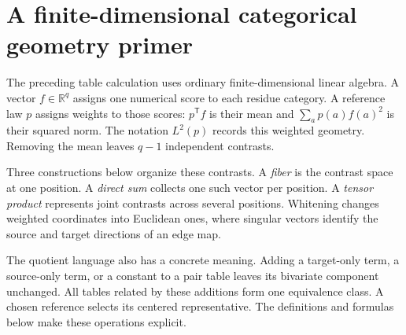 \section{A finite-dimensional categorical geometry primer}
\label{sec:book-categorical-geometry-primer}

The preceding table calculation uses ordinary finite-dimensional linear algebra.  A vector
$f\in\mathbb R^q$ assigns one numerical score to each residue category.  A reference law $p$
assigns weights to those scores: $p^{\mathsf T}f$ is their mean and
$\sum_a p(a)f(a)^2$ is their squared norm.  The notation $L^2(p)$ records this weighted geometry.
Removing the mean leaves $q-1$ independent contrasts.

Three constructions below organize these contrasts.  A \emph{fiber} is the contrast space at
one position.  A \emph{direct sum} collects one such vector per position.  A \emph{tensor product}
represents joint contrasts across several positions.  Whitening changes weighted coordinates into
Euclidean ones, where singular vectors identify the source and target directions of an edge map.

The quotient language also has a concrete meaning.  Adding a target-only term, a source-only term,
or a constant to a pair table leaves its bivariate component unchanged.  All tables related by
these additions form one equivalence class.  A chosen reference selects its centered
representative.  The definitions and formulas below make these operations explicit.

